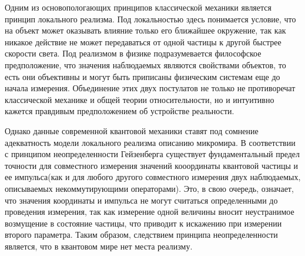 \documentclass[%
master,         %
subf,           %
href,           %
colorlinks=true %
]{disser}
\numberwithin{equation}{section}
\numberwithin{figure}{section}
\begin{document}

%
%
%
%
%
%
%
%
%

\tableofcontents

\intro
Одним из основопологающих принципов классической механики является принцип локального реализма. Под локальностью здесь понимается условие, что на объект может оказывать влияние только его ближайшее окружение, так как никакое действие не может передаваться от одной частицы к другой быстрее скорости света. Под реализмом в физике подразумевается философское предположение, что значения наблюдаемых являются свойствами объектов, то есть они объективны и могут быть приписаны физическим системам еще до начала измерения. Объединение этих двух постулатов не только не противоречат классической механике и общей теории относительности, но и интуитивно кажется правдивым предположением об устройстве реальности.

Однако данные современной квантовой механики ставят под сомнение адекватность модели локального реализма описанию микромира. В соответствии с принципом неопределенности Гейзенберга существует фундаментальный предел точности для совместного измерения значений кооординаты квантовой частицы и ее импульса(как и для любого другого совместного измерения двух наблюдаемых, описываемых некоммутирующими операторами). Это, в свою очередь, означает, что значения координаты и импульса не могут считаться определенными до проведения измерения, так как измерение одной величины вносит неустранимое возмущение в состояние частицы, что приводит к искажению при измерении второго параметра. Таким образом, следствием принципа неопределенности является, что в квантовом мире нет места реализму.
\end{document}
